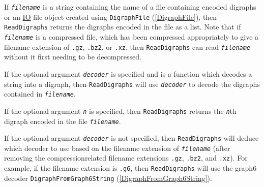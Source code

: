 \documentclass[a4paper,11pt]{report}
\begin{document}
{{{ If \mbox{\texttt{\mdseries\slshape filename}} is a string containing the name of a file containing encoded digraphs or an \href{https://gap-packages.github.io/io} {IO}  file object created using \texttt{DigraphFile} (\ref{DigraphFile}), then \texttt{ReadDigraphs} returns the digraphs encoded in the file as a list. Note that if \mbox{\texttt{\mdseries\slshape filename}} is a compressed file, which has been compressed appropriately to give a
filename extension of \texttt{.gz}, \texttt{.bz2}, or \texttt{.xz}, then \texttt{ReadDigraphs} can read \mbox{\texttt{\mdseries\slshape filename}} without it first needing to be decompressed. 

 If the optional argument \mbox{\texttt{\mdseries\slshape decoder}} is specified and is a function which decodes a string into a digraph, then \texttt{ReadDigraphs} will use \mbox{\texttt{\mdseries\slshape decoder}} to decode the digraphs contained in \mbox{\texttt{\mdseries\slshape filename}}.

 If the optional argument \mbox{\texttt{\mdseries\slshape n}} is specified, then \texttt{ReadDigraphs} returns the \mbox{\texttt{\mdseries\slshape n}}th digraph encoded in the file \mbox{\texttt{\mdseries\slshape filename}}. 

 If the optional argument \mbox{\texttt{\mdseries\slshape decoder}} is not specified, then \texttt{ReadDigraphs} will deduce which decoder to use based on the filename extension of \mbox{\texttt{\mdseries\slshape filename}} (after removing the compression\texttt{}related filename extensions \texttt{.gz}, \texttt{.bz2}, and \texttt{.xz}). For example, if the filename extension is \texttt{.g6}, then \texttt{ReadDigraphs} will use the graph6 decoder \texttt{DigraphFromGraph6String} (\ref{DigraphFromGraph6String}). 

}}}
\end{document}
